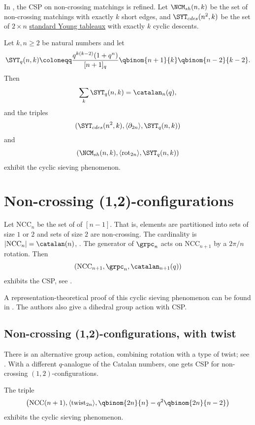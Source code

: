 In \cite[Thm.~4.8]{AlexanderssonLinussonPotkaUhlin2021}, the CSP on
non-crossing matchings is refined.
Let $\NCM_{sh}(n, k)$ be the set of non-crossing matchings with exactly $k$
short edges, and $\SYT_{cdes}(n^2,k)$ be the set of $2 \times n$
\hyperref[prelimTableaux]{standard Young tableaux} with exactly $k$ cyclic
descents.
\begin{theorem}
Let $k, n \geq 2$ be natural numbers and let
\[
 \SYT_q(n,k)
 \coloneqq
 \frac{q^{k(k-2)}(1+q^n)}{[n+1]_q}
 \qbinom{n+1}{k} \qbinom{n-2}{k-2}.
\]
Then \[
\sum_{k} \SYT_q(n,k) = \catalan_{n}(q),
\] and the triples
\[
(\SYT_{cdes}(n^2,k),\langle \partial_{2n} \rangle,\SYT_q(n,k) )\]
and
\[
(\NCM_{sh}(n, k),\langle \mathrm{rot}_{2n} \rangle, \SYT_q(n,k) )
\]
exhibit the cyclic sieving phenomenon.
\end{theorem}




\section[csp12]{Non-crossing (1,2)-configurations}

Let $\mathrm{NCC}_n$ be the set of
\label{nonCrossingOneTwoConfiguration} of $[n-1]$.
That is, elements are partitioned into sets of size $1$ or $2$
and sets of size $2$ are non-crossing.
The cardinality is $|\mathrm{NCC}_n| = \catalan(n)$,
\cite[Family 60]{StanleyCatalan}.
The generator of $\grpc_{n}$ acts on $\mathrm{NCC}_{n+1}$ by a $2\pi/n$ rotation.
Then
\[
\left( \mathrm{NCC}_{n+1}, \grpc_{n}, \catalan_{n+1}(q) \right)
\]
exhibits the CSP, see \cite{Thiel2017}.


A representation-theoretical proof of this cyclic sieving phenomenon can be
found in \cite{ZengZhang2024x}.  The authors also give a dihedral group action
with CSP.


\subsection[csp12twist]{Non-crossing (1,2)-configurations, with twist}

There is an alternative group action, combining rotation with a type of twist;
see \cite[Thm.~5.4]{AlexanderssonLinussonPotkaUhlin2021}.
With a different $q$-analogue of the Catalan numbers, one gets CSP for
non-crossing $(1,2)$-configurations.
\begin{theorem}
The triple
\[
\left(
\mathrm{NCC}(n+1), \langle \mathrm{twist}_{2n} \rangle,
\qbinom{2n}{n} - q^2 \qbinom{2n}{n-2}
\right)
\]
exhibits the cyclic sieving phenomenon.
\end{theorem}

